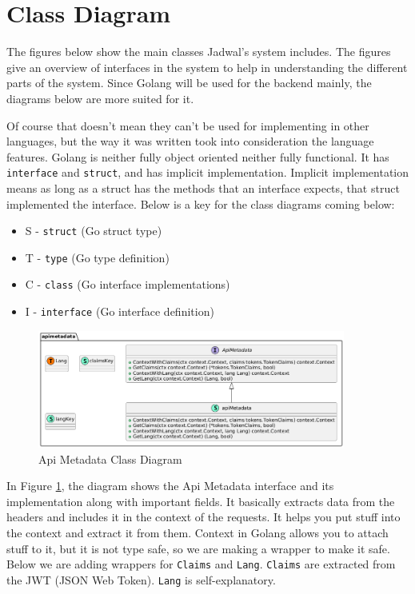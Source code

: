 \section{Class Diagram}

The figures below show the main classes Jadwal's system includes. The figures give an overview of interfaces in the system to help in understanding the different parts of the system. Since Golang will be used for the backend mainly, the diagrams below are more suited for it.

Of course that doesn't mean they can't be used for implementing in other languages, but the way it was written took into consideration the language features. Golang is neither fully object oriented neither fully functional. It has \texttt{interface} and \texttt{struct}, and has implicit implementation. Implicit implementation means as long as a struct has the methods that an interface expects, that struct implemented the interface. Below is a key for the class diagrams coming below:
\begin{itemize}
    \item S - \texttt{struct} (Go struct type)
    \item T - \texttt{type} (Go type definition)
    \item C - \texttt{class} (Go interface implementations)
    \item I - \texttt{interface} (Go interface definition)
\end{itemize}

\newpage

\begin{figure}[!h]
    \centering
    \includegraphics[width=0.9\textwidth]{images/docs/diagrams/class/class-diagram/apimetadata.png}
    \caption{Api Metadata Class Diagram}
    \label{fig:api-metadata-class-diagram}
\end{figure}

In Figure \ref{fig:api-metadata-class-diagram}, the diagram shows the Api Metadata interface and its implementation along with important fields. It basically extracts data from the headers and includes it in the context of the requests. It helps you put stuff into the context and extract it from them. Context in Golang allows you to attach stuff to it, but it is not type safe, so we are making a wrapper to make it safe. Below we are adding wrappers for \texttt{Claims} and \texttt{Lang}. \texttt{Claims} are extracted from the JWT (JSON Web Token). \texttt{Lang} is self-explanatory.

